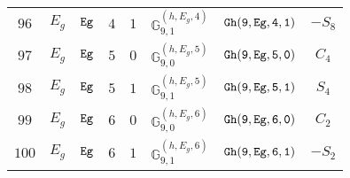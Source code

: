 \documentclass[fleqn,8pt]{jsarticle}
\begin{document}
\begin{table}[ht!]
\begin{center}
\begin{tabular}{cccccccc}
$ 96 $ & $ E_{g} $ & $ {\tt Eg} $ & $ 4 $ & $ 1 $ & $ \mathbb{G}_{9,1}^{(h,E_{g},4)} $ & $ {\tt Gh(9,Eg,4,1)} $ & $ - S_{8} $ \\
$ 97 $ & $ E_{g} $ & $ {\tt Eg} $ & $ 5 $ & $ 0 $ & $ \mathbb{G}_{9,0}^{(h,E_{g},5)} $ & $ {\tt Gh(9,Eg,5,0)} $ & $ C_{4} $ \\
$ 98 $ & $ E_{g} $ & $ {\tt Eg} $ & $ 5 $ & $ 1 $ & $ \mathbb{G}_{9,1}^{(h,E_{g},5)} $ & $ {\tt Gh(9,Eg,5,1)} $ & $ S_{4} $ \\
$ 99 $ & $ E_{g} $ & $ {\tt Eg} $ & $ 6 $ & $ 0 $ & $ \mathbb{G}_{9,0}^{(h,E_{g},6)} $ & $ {\tt Gh(9,Eg,6,0)} $ & $ C_{2} $ \\
$ 100 $ & $ E_{g} $ & $ {\tt Eg} $ & $ 6 $ & $ 1 $ & $ \mathbb{G}_{9,1}^{(h,E_{g},6)} $ & $ {\tt Gh(9,Eg,6,1)} $ & $ - S_{2} $ \\
 \hline \hline
\end{tabular}
\end{center}
\end{table}
\end{document}
